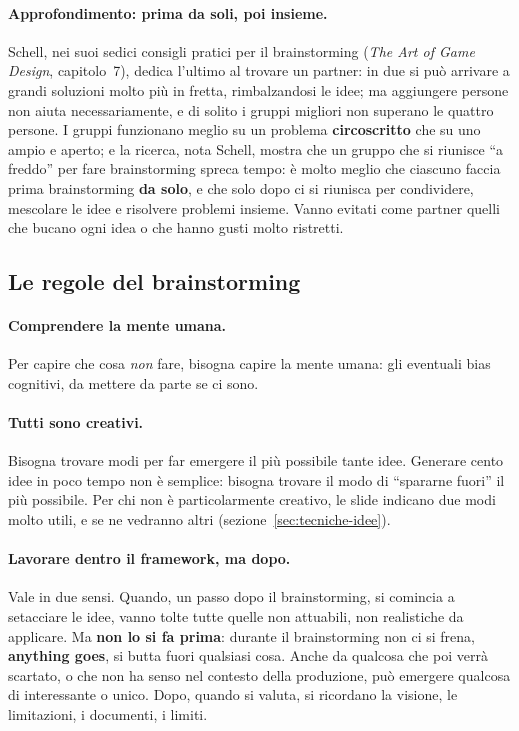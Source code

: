\paragraph{Approfondimento: prima da soli, poi insieme.} Schell, nei suoi
sedici consigli pratici per il brainstorming (\emph{The Art of Game Design},
capitolo~7), dedica l'ultimo al trovare un partner: in due si può arrivare a
grandi soluzioni molto più in fretta, rimbalzandosi le idee; ma aggiungere
persone non aiuta necessariamente, e di solito i gruppi migliori non superano
le quattro persone. I gruppi funzionano meglio su un problema
\textbf{circoscritto} che su uno ampio e aperto; e la ricerca, nota Schell,
mostra che un gruppo che si riunisce ``a freddo'' per fare brainstorming
spreca tempo: è molto meglio che ciascuno faccia prima brainstorming
\textbf{da solo}, e che solo dopo ci si riunisca per condividere, mescolare le
idee e risolvere problemi insieme. Vanno evitati come partner quelli che
bucano ogni idea o che hanno gusti molto ristretti.

\subsection{Le regole del brainstorming}

\paragraph{Comprendere la mente umana.} Per capire che cosa \emph{non} fare,
bisogna capire la mente umana: gli eventuali bias cognitivi, da mettere da
parte se ci sono.

\paragraph{Tutti sono creativi.} Bisogna trovare modi per far emergere il più
possibile tante idee. Generare cento idee in poco tempo non è semplice:
bisogna trovare il modo di ``spararne fuori'' il più possibile. Per chi non è
particolarmente creativo, le slide indicano due modi molto utili, e se ne
vedranno altri (sezione~\ref{sec:tecniche-idee}).

\paragraph{Lavorare dentro il framework, ma dopo.} Vale in due sensi. Quando,
un passo dopo il brainstorming, si comincia a setacciare le idee, vanno tolte
tutte quelle non attuabili, non realistiche da applicare. Ma \textbf{non lo si
fa prima}: durante il brainstorming non ci si frena, \textbf{anything goes},
si butta fuori qualsiasi cosa. Anche da qualcosa che poi verrà scartato, o che
non ha senso nel contesto della produzione, può emergere qualcosa di
interessante o unico. Dopo, quando si valuta, si ricordano la visione, le
limitazioni, i documenti, i limiti.

